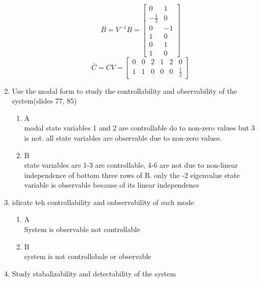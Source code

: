 \begin{enumerate}
\begin{enumerate}
\begin{equation}
      \end{equation}
      \begin{equation}
        \bar B = V^{-1}B = 
        \left[\begin{matrix}0 & 1\\- \frac{1}{2} & 0\\0 & -1\\1 & 0\\0 & 1\\1 & 0\end{matrix}\right]
      \end{equation}
      \begin{equation}
        \bar C = CV =
        \left[\begin{matrix}0 & 0 & 2 & 1 & 2 & 0\\1 & 1 & 0 & 0 & 0 & \frac{1}{2}\end{matrix}\right]
      \end{equation}
    \end{enumerate}
  \item Use the modal form to study the controllability and observability of the system(slides 77, 85)\\
    \begin{enumerate}
    \item A\\
      modal state variables 1 and 2 are controllable do to non-zero values but 3 is not. all state variables are
      observable due to non-zero values. 
    \item B\\
      state variables are 1-3 are controllable, 4-6 are not due to non-linear independence of bottom three rows
      of B. only the -2 eigenvalue state variable is observable because of its linear independence 
    \end{enumerate}
  \item idicate teh controllability and onbservability of each mode\\
    \begin{enumerate}
    \item A\\
      System is observable not controllable
    \item B\\
      system is not controllobale or observable
    \end{enumerate}
  \item Study stabalizability and detectability of the system\\
    \begin{enumerate}

\end{enumerate}
\end{enumerate}
